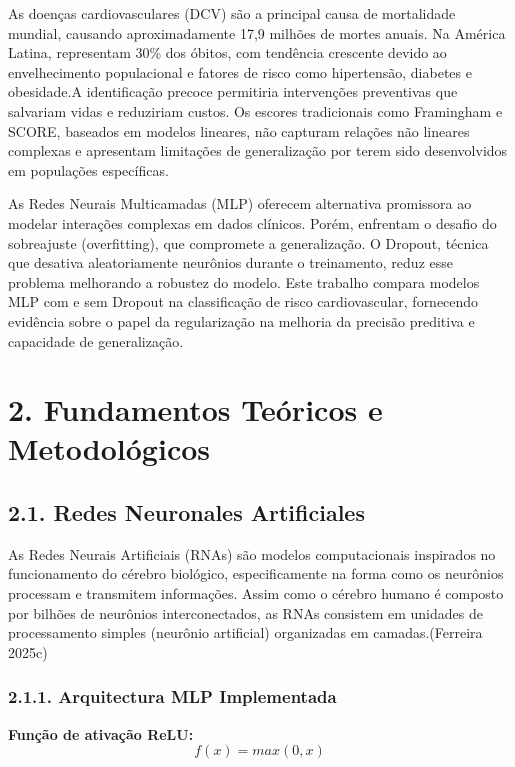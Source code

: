 \documentclass[
  oneclumn]{article}
\begin{document}
As doenças cardiovasculares (DCV) são a principal causa de mortalidade
mundial, causando aproximadamente 17,9 milhões de mortes anuais. Na
América Latina, representam 30\% dos óbitos, com tendência crescente
devido ao envelhecimento populacional e fatores de risco como
hipertensão, diabetes e obesidade.A identificação precoce permitiria
intervenções preventivas que salvariam vidas e reduziriam custos. Os
escores tradicionais como Framingham e SCORE, baseados em modelos
lineares, não capturam relações não lineares complexas e apresentam
limitações de generalização por terem sido desenvolvidos em populações
específicas.

As Redes Neurais Multicamadas (MLP) oferecem alternativa promissora ao
modelar interações complexas em dados clínicos. Porém, enfrentam o
desafio do sobreajuste (overfitting), que compromete a generalização. O
Dropout, técnica que desativa aleatoriamente neurônios durante o
treinamento, reduz esse problema melhorando a robustez do modelo. Este
trabalho compara modelos MLP com e sem Dropout na classificação de risco
cardiovascular, fornecendo evidência sobre o papel da regularização na
melhoria da precisão preditiva e capacidade de generalização.

\section{2. Fundamentos Teóricos e
Metodológicos}\label{fundamentos-teuxf3ricos-e-metodoluxf3gicos}

\subsection{2.1. Redes Neuronales
Artificiales}\label{redes-neuronales-artificiales}

As Redes Neurais Artificiais (RNAs) são modelos computacionais
inspirados no funcionamento do cérebro biológico, especificamente na
forma como os neurônios processam e transmitem informações. Assim como o
cérebro humano é composto por bilhões de neurônios interconectados, as
RNAs consistem em unidades de processamento simples (neurônio
artificial) organizadas em camadas.(Ferreira 2025c)

\subsubsection{2.1.1. Arquitectura MLP
Implementada}\label{arquitectura-mlp-implementada}

\textbf{Função de ativação ReLU:} \[f(x) = max(0, x)\]
\end{document}
